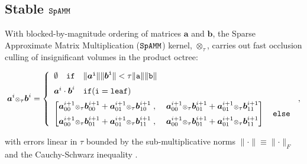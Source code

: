 \documentclass[letterpaper,twocolumn,amsmath,amsfont,amssymb,english,aps,jcp,preprintnumbers,groupaddress,nofootinbib,tightenlines,floatfix]{revtex4}
\newcommand{\mat}[1]{\boldsymbol{#1}}
\newcommand{\ot}{  {\scriptstyle \otimes}_{ \tau } }
\theoremstyle{plain}
\theoremstyle{remark}
\theoremstyle{plain}
\begin{document}
\subsection{Stable $\tt SpAMM$}

With blocked-by-magnitude ordering of matrices $\mat{a}$ and
$\mat{b}$, the Sparse Approximate Matrix Multiplication ($\tt SpAMM$)
kernel, $\ot$, carries out fast occlusion culling of insignificant
volumes in the product octree:
\begin{widetext}
\begin{equation}
\mat{a}^{i} \ot \mat{b}^{i} =
\left\{
        \begin{array}{ll}
                 \emptyset \quad \tt{if}\quad \lVert \mat{a}^i \rVert \lVert \mat{b}^i \rVert < \tau \lVert a \rVert \lVert b \rVert \\[0.2cm]
                 \mat{a} ^i \cdot \mat{b}^i \quad  \tt{if}(i=\tt{leaf}) \\[0.2cm]
\begin{bmatrix} \mat{a}^{i+1}_{00} \ot \mat{b}^{i+1}_{00} +\mat{a}^{i+1}_{01} \ot \mat{b}^{i+1}_{10} \; , \; &
                \mat{a}^{i+1}_{00} \ot \mat{b}^{i+1}_{01} +\mat{a}^{i+1}_{01} \ot \mat{b}^{i+1}_{11}  \\[0.2cm]
                \mat{a}^{i+1}_{00} \ot \mat{b}^{i+1}_{01} +\mat{a}^{i+1}_{01} \ot \mat{b}^{i+1}_{11} \; , \; &
                \mat{a}^{i+1}_{00} \ot \mat{b}^{i+1}_{01} +\mat{a}^{i+1}_{01} \ot \mat{b}^{i+1}_{11}
\end{bmatrix}  \quad \tt{else}
                \end{array}
              \right.  \, ,
\end{equation}
\end{widetext}
with errors linear in $\tau$ bounded by the sub-multiplicative norms
$\lVert \cdot \rVert \equiv \lVert \cdot \rVert_F$ and the
Cauchy-Schwarz inequality \cite{kahan,}.
\end{document}
